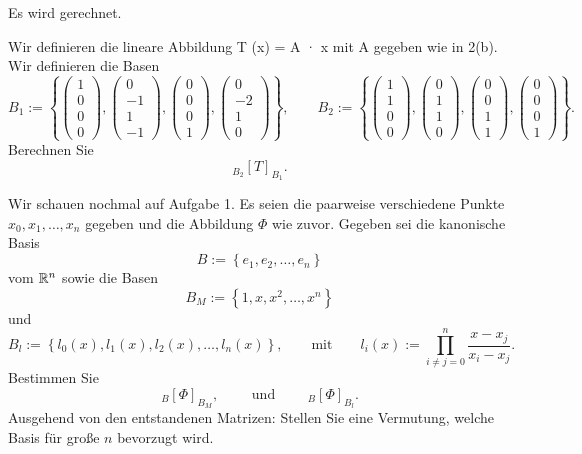 \begin{Problem}
	Es wird gerechnet.
	\begin{parts}
	\item Wir definieren die lineare Abbildung T (x) = A · x mit A gegeben wie in 2(b). Wir definieren die Basen
		\[
		B_1:=\left\{ \begin{pmatrix} 1 \\ 0 \\ 0 \\ 0 \end{pmatrix} , \begin{pmatrix} 0 \\ -1 \\ 1 \\ -1 \end{pmatrix} , \begin{pmatrix} 0 \\ 0 \\ 0 \\ 1 \end{pmatrix} , \begin{pmatrix} 0 \\ -2 \\ 1 \\ 0 \end{pmatrix}  \right\},\qquad B_2:=\left\{ \begin{pmatrix} 1 \\ 1 \\ 0 \\ 0 \end{pmatrix} , \begin{pmatrix} 0 \\ 1 \\ 1 \\ 0 \end{pmatrix} , \begin{pmatrix} 0 \\ 0 \\ 1 \\ 1 \end{pmatrix} , \begin{pmatrix} 0 \\ 0 \\ 0 \\1 \end{pmatrix}  \right\} 
		.\] 
		Berechnen Sie
		\[
			_{B_2}[T]_{B_1}
		.\] 
	\item Wir schauen nochmal auf Aufgabe 1. Es seien die paarweise verschiedene Punkte $x_0, x_1 , \dots, x_n$ gegeben und die Abbildung $\Phi$ wie zuvor. Gegeben sei die kanonische Basis
		\[
		B:=\left\{ e_1,e_2,\dots,e_n \right\} 
		\]
		vom $\mathbb{R}^n$ sowie die Basen
		\[
		B_M:=\left\{ 1,x,x^2,\dots, x^n \right\} 
		\]
		und
		\[
			B_l:=\left\{ l_0(x),l_1(x),l_2(x),\dots,l_n(x) \right\} ,\qquad \text{mit}\qquad l_i(x):=\prod_{i\neq j = 0}^{n} \frac{x-x_j}{x_i-x_j} 
		.\] 
		Bestimmen Sie
		\[
			_B[\Phi]_{B_M},\qquad\text{ und }\qquad {}_B[\Phi]_{B_l}
		.\] 
Ausgehend von den entstandenen Matrizen: Stellen Sie eine Vermutung, welche Basis für große $n$ bevorzugt wird.
	\end{parts}
\end{Problem}
